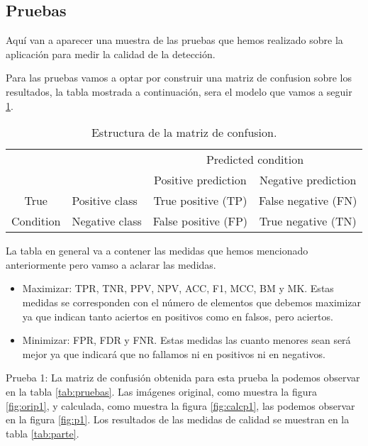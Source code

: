 \subsection{Pruebas}
Aquí van a aparecer una muestra de las pruebas que hemos realizado sobre la aplicación para medir la calidad de la detección.


Para las pruebas vamos a optar por construir una matriz de confusion sobre los resultados, la tabla mostrada a continuación, sera el modelo que vamos a seguir \ref{tab:ConfMatrix}.

\begin{table}
  \begin{center}
    \begin{tabular}{c l c c}
                 &                & \multicolumn{2}{c}{\cellcolor{brown!25}Predicted condition}   \\
                 &                & \cellcolor{brown!15}Positive prediction & \cellcolor{brown!45}Negative prediction \\
       \cellcolor{blue!15}True      & \cellcolor{blue!10}Positive class & \cellcolor{green!25}True positive (TP)  & \cellcolor{red!25}False negative (FN) \\
       \cellcolor{blue!15}Condition & \cellcolor{blue!30}Negative class & \cellcolor{red!25}False positive (FP) & \cellcolor{green!25}True negative (TN)  \\
    \end{tabular}
  \end{center}
  \caption{Estructura de la matriz de confusion.}
  \label{tab:ConfMatrix}
\end{table}


La tabla en general va a contener las medidas que hemos mencionado anteriormente pero vamso a aclarar las medidas.
\begin{itemize}
\item Maximizar: TPR, TNR, PPV, NPV, ACC, F1, MCC, BM y MK.
Estas medidas se corresponden con el número de elementos que debemos maximizar ya que indican tanto aciertos en positivos como en falsos, pero aciertos.
\item Minimizar: FPR, FDR y FNR.
Estas medidas las cuanto menores sean será mejor ya que indicará que no fallamos ni en positivos ni en negativos.
\end{itemize}

Prueba 1: La matriz de confusión obtenida para esta prueba la podemos observar en la tabla \ref{tab:pruebas}.
Las imágenes original, como muestra la figura \ref{fig:orip1}, y calculada, como muestra la figura \ref{fig:calcp1}, las podemos observar en la figura \ref{fig:p1}.
Los resultados de las medidas de calidad se muestran en la tabla \ref{tab:parte}.

